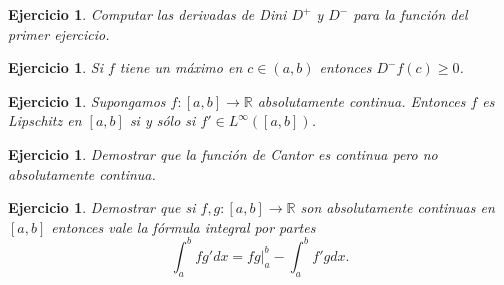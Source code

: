 \documentclass{article}
\newcounter{ejer}
\newtheorem{ejercicio}[ejer]{Ejercicio}}
\newcommand{\rr}{\mathbb{R}}
\begin{document}
\begin{ejercicio} Computar las derivadas de Dini $D^+$ y $D^-$ para la función del primer ejercicio.
 \end{ejercicio}

 \begin{ejercicio}Si $f$ tiene un máximo en $c\in (a,b)$ entonces $D^-f(c)\geq 0$.
   \end{ejercicio}

   \begin{ejercicio} Supongamos  $f:[a,b]\to\rr$ absolutamente continua. Entonces $f$ es Lipschitz en $[a,b]$ si y sólo si $f'\in L^{\infty}([a,b])$.

   \end{ejercicio}

   \begin{ejercicio} Demostrar que la función de Cantor es continua pero no absolutamente continua.

   \end{ejercicio}


\begin{ejercicio} Demostrar que si $f,g:[a,b]\to\rr$ son absolutamente continuas en $[a,b]$ entonces vale la fórmula integral por partes
 \[\int_a^bfg'dx=fg\Big|_a^b-\int_a^bf'gdx.\]
\end{ejercicio}
\end{document}
